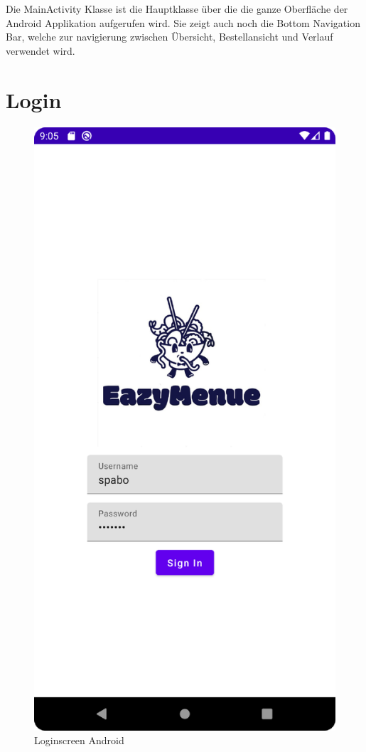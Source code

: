Die MainActivity Klasse ist die Hauptklasse über die die ganze Oberfläche der Android Applikation aufgerufen wird. 
Sie zeigt auch noch die Bottom Navigation Bar, welche zur navigierung zwischen Übersicht, Bestellansicht und Verlauf verwendet wird.







\pagebreak


\section{Login}
\begin{figure}[htp]
    \centering
    \author{Bozidar Spasenovic}
    \includegraphics[scale=0.1]{pics/LoginScreenAnndroid.png}
    \caption{Loginscreen Android}
    \label{fig:impl:LoginScreenAnndroid}
\end{figure}

